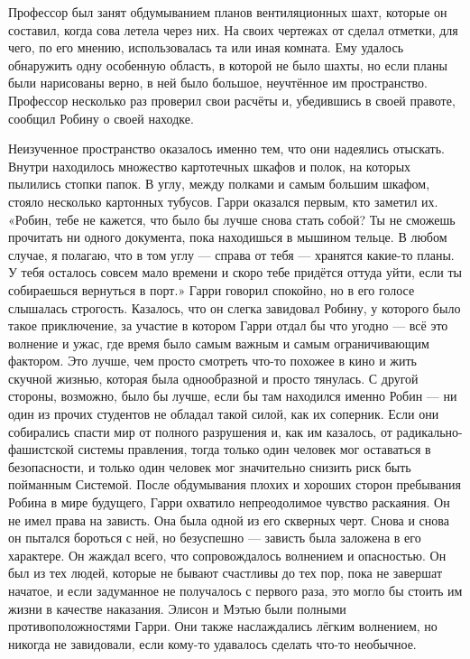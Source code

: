\documentclass[a4paper,12pt]{book}
\begin{document}
	Профессор был занят обдумыванием планов вентиляционных шахт, которые он составил, когда сова летела через них. На своих чертежах от сделал отметки, для чего, по его мнению, использовалась та или иная комната. Ему удалось обнаружить одну особенную область, в которой не было шахты, но если планы были нарисованы верно, в ней было большое, неучтённое им пространство. Профессор несколько раз проверил свои расчёты и, убедившись в своей правоте, сообщил Робину о своей находке.
	
	Неизученное пространство оказалось именно тем, что они надеялись отыскать. Внутри находилось множество картотечных шкафов и полок, на которых пылились стопки папок. В углу, между полками и самым большим шкафом, стояло несколько картонных тубусов. Гарри оказался первым, кто заметил их.
	«Робин, тебе не кажется, что было бы лучше снова стать собой? Ты не сможешь прочитать ни одного документа, пока находишься в мышином тельце. В любом случае, я полагаю, что в том углу — справа от тебя — хранятся какие-то планы. У тебя осталось совсем мало времени и скоро тебе придётся оттуда уйти, если ты собираешься вернуться в порт.»
	Гарри говорил спокойно, но в его голосе слышалась строгость. Казалось, что он слегка завидовал Робину, у которого было такое приключение, за участие в котором Гарри отдал бы что угодно — всё это волнение и ужас, где время было самым важным и самым ограничивающим фактором. Это лучше, чем просто смотреть что-то похожее в кино и жить скучной жизнью, которая была однообразной и просто тянулась.
	С другой стороны, возможно, было бы лучше, если бы там находился именно Робин — ни один из прочих студентов не обладал такой силой, как их соперник. Если они собирались спасти мир от полного разрушения и, как им казалось, от радикально-фашистской системы правления, тогда только один человек мог оставаться в безопасности, и только один человек мог значительно снизить риск быть пойманным Системой. После обдумывания плохих и хороших сторон пребывания Робина в мире будущего, Гарри охватило непреодолимое чувство раскаяния. Он не имел права на зависть. Она была одной из его скверных черт. Снова и снова он пытался бороться с ней, но безуспешно — зависть была заложена в его характере. Он жаждал всего, что сопровождалось волнением и опасностью. Он был из тех людей, которые не бывают счастливы до тех пор, пока не завершат начатое, и если задуманное не получалось с первого раза, это могло бы стоить им жизни в качестве наказания.
	Элисон и Мэтью были полными противоположностями Гарри. Они также наслаждались лёгким волнением, но никогда не завидовали, если кому-то удавалось сделать что-то необычное.
\end{document}
